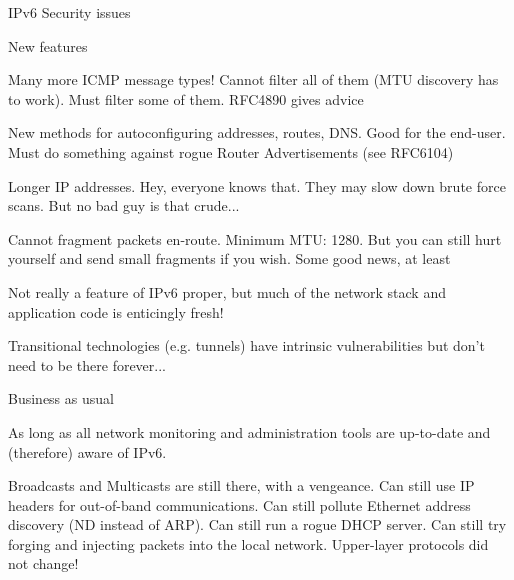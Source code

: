 IPv6 Security issues

New features

Many more ICMP message types! Cannot filter all of them (MTU discovery has to work). Must filter some of them. RFC4890 gives advice

New methods for autoconfiguring addresses, routes, DNS. Good for the end-user. Must do something against rogue Router Advertisements (see RFC6104)

Longer IP addresses. Hey, everyone knows that. They may slow down brute force scans. But no bad guy is that crude...

Cannot fragment packets en-route.  Minimum MTU: 1280. But you can still hurt yourself and send small fragments if you wish. Some good news, at least

Not really a feature of IPv6 proper, but much of the network stack and application code is enticingly fresh!

Transitional technologies (e.g. tunnels) have intrinsic vulnerabilities but don't need to be there forever...


Business as usual

As long as all network monitoring and administration tools are up-to-date and (therefore) aware of IPv6.

Broadcasts and Multicasts are still there, with a vengeance.
Can still use IP headers for out-of-band communications.
Can still pollute Ethernet address discovery (ND instead of ARP).
Can still run a rogue DHCP server.
Can still try forging and injecting packets into the local network. 
Upper-layer protocols did not change!